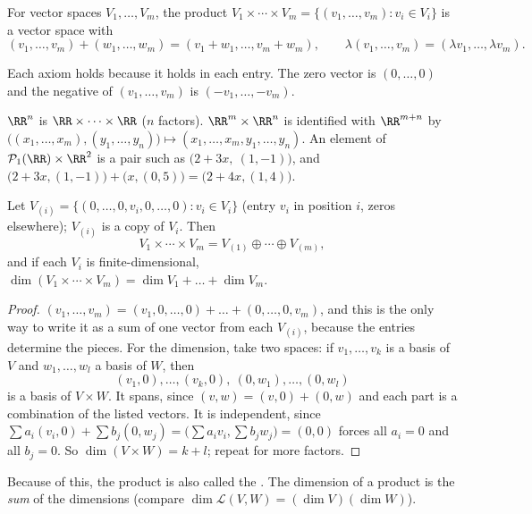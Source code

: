 \documentclass[10pt]{scrartcl}
\newcommand{\LL}{\mathcal L}
\newcommand{\PP}{\mathcal P}
\begin{document}
\begin{proposition*}
  For vector spaces $V_1,\dots,V_m$, the product $V_1\times\cdots\times V_m=\{(v_1,\dots,v_m):v_i\in V_i\}$ is a vector space with
  \[ (v_1,\dots,v_m)+(w_1,\dots,w_m)=(v_1+w_1,\dots,v_m+w_m),\qquad\lambda(v_1,\dots,v_m)=(\lambda v_1,\dots,\lambda v_m). \]
\end{proposition*}
Each axiom holds because it holds in each entry. The zero vector is $(0,\dots,0)$ and the negative of $(v_1,\dots,v_m)$ is $(-v_1,\dots,-v_m)$.

\begin{example*}[Ex.~39, 40]
  $\RR^n$ is $\RR\times\cdots\times\RR$ ($n$ factors). $\RR^m\times\RR^n$ is identified with $\RR^{m+n}$ by $\big((x_1,\dots,x_m),(y_1,\dots,y_n)\big)\mapsto(x_1,\dots,x_m,y_1,\dots,y_n)$. An element of $\PP_1(\RR)\times\RR^2$ is a pair such as $\big(2+3x,\ (1,-1)\big)$, and $\big(2+3x,(1,-1)\big)+\big(x,(0,5)\big)=\big(2+4x,(1,4)\big)$.
\end{example*}

\begin{proposition*}
  Let $V_{(i)}=\{(0,\dots,0,v_i,0,\dots,0):v_i\in V_i\}$ (entry $v_i$ in position $i$, zeros elsewhere); $V_{(i)}$ is a copy of $V_i$. Then
  \[ V_1\times\cdots\times V_m=V_{(1)}\oplus\cdots\oplus V_{(m)}, \]
  and if each $V_i$ is finite-dimensional, $\dim(V_1\times\cdots\times V_m)=\dim V_1+\dots+\dim V_m$.
\end{proposition*}
\begin{proof}
  $(v_1,\dots,v_m)=(v_1,0,\dots,0)+\dots+(0,\dots,0,v_m)$, and this is the only way to write it as a sum of one vector from each $V_{(i)}$, because the entries determine the pieces. For the dimension, take two spaces: if $v_1,\dots,v_k$ is a basis of $V$ and $w_1,\dots,w_l$ a basis of $W$, then
  \[ (v_1,0),\dots,(v_k,0),\ (0,w_1),\dots,(0,w_l) \]
  is a basis of $V\times W$. It spans, since $(v,w)=(v,0)+(0,w)$ and each part is a combination of the listed vectors. It is independent, since $\sum a_i(v_i,0)+\sum b_j(0,w_j)=\big(\sum a_iv_i,\sum b_jw_j\big)=(0,0)$ forces all $a_i=0$ and all $b_j=0$. So $\dim(V\times W)=k+l$; repeat for more factors.
\end{proof}
Because of this, the product is also called the . The dimension of a product is the \emph{sum} of the dimensions (compare $\dim\LL(V,W)=(\dim V)(\dim W)$).
\end{document}
